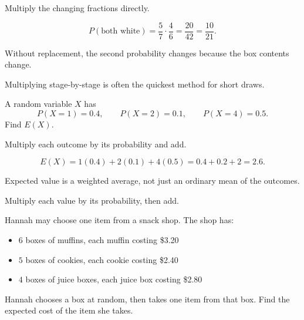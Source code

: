\begin{hint}
Multiply the changing fractions directly.
\end{hint}

\begin{solution}
\[
P(\text{both white})=\frac57\cdot\frac46=\frac{20}{42}=\frac{10}{21}.
\]
\end{solution}

\begin{takeaways}
\item Without replacement, the second probability changes because the box contents change.
\item Multiplying stage-by-stage is often the quickest method for short draws.
\end{takeaways}

\begin{problem}
A random variable $X$ has
\[
P(X=1)=0.4,\qquad P(X=2)=0.1,\qquad P(X=4)=0.5.
\]
Find $E(X)$.
\end{problem}

\begin{hint}
Multiply each outcome by its probability and add.
\end{hint}

\begin{solution}
\[
E(X)=1(0.4)+2(0.1)+4(0.5)=0.4+0.2+2=2.6.
\]
\end{solution}

\begin{takeaways}
\item Expected value is a weighted average, not just an ordinary mean of the outcomes.
\item Multiply each value by its probability, then add.
\end{takeaways}

\begin{problem}
Hannah may choose one item from a snack shop. The shop has:
\begin{itemize}[leftmargin=*]
  \item $6$ boxes of muffins, each muffin costing \$3.20
  \item $5$ boxes of cookies, each cookie costing \$2.40
  \item $4$ boxes of juice boxes, each juice box costing \$2.80
\end{itemize}

Hannah chooses a box at random, then takes one item from that box. Find the expected cost of the item she takes.
\end{problem}

